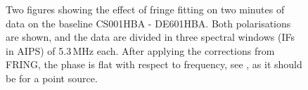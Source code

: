 \begin{figure}[htbp]
\centering
{}
\caption{
Two figures showing the effect of fringe fitting on two minutes of data on the baseline CS001HBA - DE601HBA. Both 
polarisations are shown, and the data are divided in three spectral windows (IFs in AIPS) of 5.3\,MHz each. 
After applying the corrections from FRING,
the phase is flat with respect to frequency, see , as it should be for a point source.
\label{fig:fringex}
}
\end{figure}

